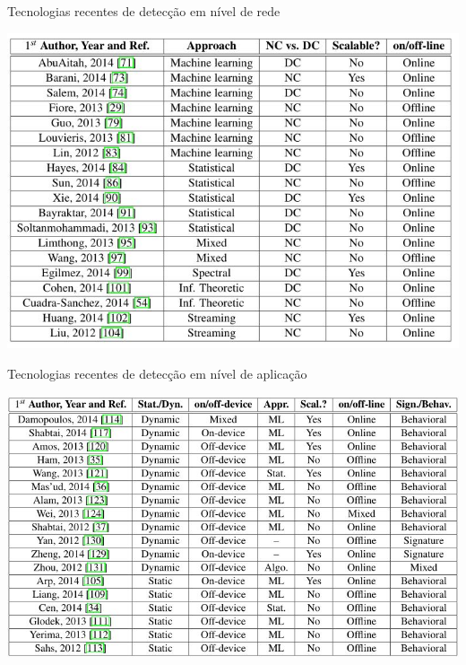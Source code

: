\begin{table}[h]
\caption{\small Tecnologias recentes de detecção em nível de rede}
\centering
\includegraphics[scale=0.7]{figs/tabela_deteccao_nivel_rede.JPG}
\label{f.tabeladeteccao_rede}
\end{table}

\begin{table}[h]
\caption{\small Tecnologias recentes de detecção em nível de aplicação}
\centering
\includegraphics[scale=0.7]{figs/tabela_deteccao_nivel_aplicacao.JPG}
\label{f.tabeladeteccao_app}
\end{table}








